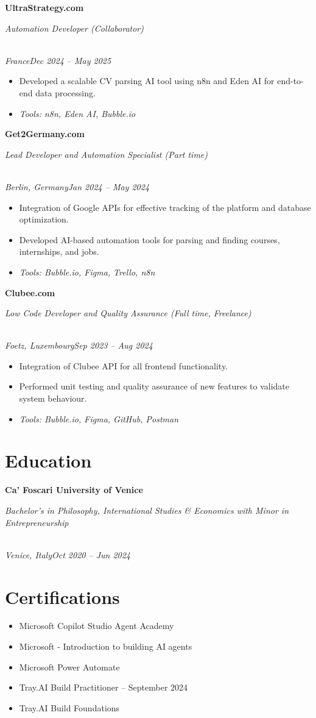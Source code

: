 \documentclass[a4paper,10pt]{article}
\newcommand{\role}[4]{\vspace{3pt}\noindent\hspace{0.6em}\parbox[t]{0.38\textwidth}{\raggedright\textbf{#1}}\hfill\parbox[t]{0.58\textwidth}{\raggedleft\textit{#2}}\\{\textit{#3}\hfill\textit{#4}}\vspace{1pt}}
\begin{document}
\role{UltraStrategy.com}{Automation Developer (Collaborator)}{France}{Dec 2024 -- May 2025}
\begin{itemize}
\item Developed a scalable CV parsing AI tool using n8n and Eden AI for end-to-end data processing.
\item \textit{Tools: n8n, Eden AI, Bubble.io}
\end{itemize}

\role{Get2Germany.com}{Lead Developer and Automation Specialist (Part time)}{Berlin, Germany}{Jan 2024 -- May 2024}
\begin{itemize}
\item Integration of Google APIs for effective tracking of the platform and database optimization.
\item Developed AI-based automation tools for parsing and finding courses, internships, and jobs.
\item \textit{Tools: Bubble.io, Figma, Trello, n8n}
\end{itemize}

\role{Clubee.com}{Low Code Developer and Quality Assurance (Full time, Freelance)}{Foetz, Luxembourg}{Sep 2023 -- Aug 2024}
\begin{itemize}
\item Integration of Clubee API for all frontend functionality.
\item Performed unit testing and quality assurance of new features to validate system behaviour.
\item \textit{Tools: Bubble.io, Figma, GitHub, Postman}
\end{itemize}

\section{Education}
\role{Ca' Foscari University of Venice}{Bachelor's in Philosophy, International Studies \& Economics with Minor in Entrepreneurship}{Venice, Italy}{Oct 2020 -- Jun 2024}

\section{Certifications}
\begin{itemize}
\item Microsoft Copilot Studio Agent Academy
\item Microsoft - Introduction to building AI agents
\item Microsoft Power Automate
\item Tray.AI Build Practitioner -- September 2024
\item Tray.AI Build Foundations
\end{itemize}
\end{document}
